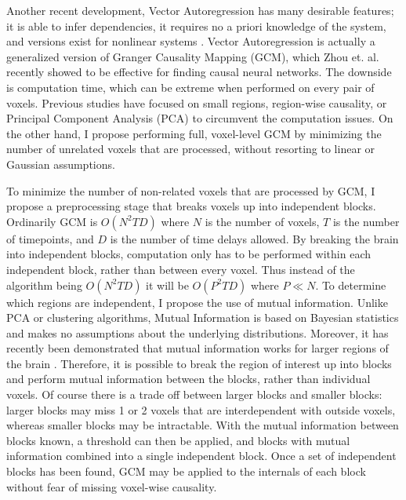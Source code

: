 \documentclass[12pt]{article}
\begin{document}
Another recent development, Vector Autoregression has many desirable
features; it is able to infer dependencies, it requires no a priori knowledge of the system,
and versions exist for nonlinear systems \cite{NVAR}. 
Vector Autoregression is actually a generalized version of Granger Causality Mapping (GCM),
which Zhou et. al. \cite{granger} recently showed to be effective for
finding causal neural networks. The downside is computation time, which can
be extreme when performed on every pair of voxels. Previous studies have focused on small
regions, region-wise causality, or Principal Component Analysis (PCA)
to circumvent the computation issues. On the other hand, I propose
performing full, voxel-level GCM by minimizing the number of unrelated voxels
that are processed, without resorting to linear or Gaussian assumptions.

\bigskip
To minimize the number of non-related voxels that are processed by GCM, I propose
a preprocessing stage that breaks voxels up into independent blocks. Ordinarily
GCM is $O(N^2TD)$ where $N$ is the number of voxels, $T$ is the
number of timepoints, and $D$ is the number of time delays allowed. By breaking
the brain into independent blocks, computation only has to be performed within each
independent block, rather than between every voxel. 
Thus instead of the algorithm being $O(N^2TD)$ it will be $O(P^2TD)$ where $P \ll N$. 
To determine which regions are independent, I propose
the use of mutual information. Unlike PCA or clustering algorithms, 
Mutual Information is based
on Bayesian statistics and makes no assumptions about the underlying distributions.
Moreover, it has recently been demonstrated that mutual information works for larger 
regions of the brain \cite{regionalMI}. Therefore, it is possible to break the
region of interest up into blocks and perform mutual information between the blocks,
rather than individual voxels. Of course there is a trade off between larger blocks
and smaller blocks: larger blocks may miss 1 or 2 voxels that are interdependent with
outside voxels, whereas smaller blocks may be intractable. With the mutual
information between blocks known, a threshold can then be applied, and blocks with 
mutual information combined into a single independent block.
Once a set of independent blocks has been found, GCM may be applied to the internals
of each block without fear of missing voxel-wise causality.
\end{document}

